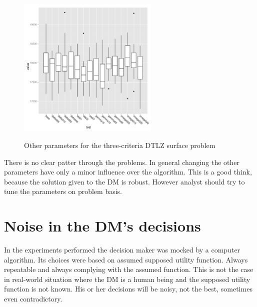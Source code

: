 \begin{figure}
{{      \includegraphics[width=0.60\textwidth]{exp/nouncert/c3_params2}
    }
  }
  \caption{Other parameters for the three-criteria DTLZ surface problem}
  \label{params2}
\end{figure}

There is no clear patter through the problems. In general changing the other
parameters have only a minor influence over the algorithm. This is a good
think, because the solution given to the DM is robust. However analyst should
try to tune the parameters on problem basis. 

\clearpage{}
\section{Noise in the DM's decisions}

In the experiments performed the decision maker was mocked by a computer
algorithm. Its choices were based on assumed supposed utility function. Always
repeatable and always complying with the assumed function. This is not the
case in real-world situation where the DM is a human being and the supposed
utility function is not known. His or her decisions will be noisy, not the
best, sometimes even contradictory.

